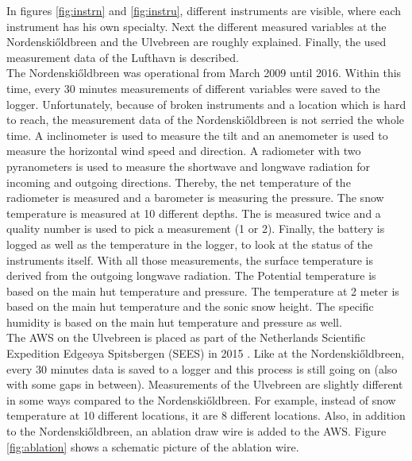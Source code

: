 \documentclass[11pt]{report}
\begin{document}
In figures \ref{fig:instrn} and \ref{fig:instru}, different instruments are visible, where each instrument has his own specialty. Next the different measured variables at the Nordenski\H{o}ldbreen and the Ulvebreen are roughly explained. Finally, the used measurement data of the Lufthavn is described.\\

The Nordenski\H{o}ldbreen was operational from March 2009 until 2016. Within this time, every 30 minutes measurements of different variables were saved to the logger. Unfortunately, because of broken instruments and a location which is hard to reach, the measurement data of the Nordenski\H{o}ldbreen is not serried the whole time. A inclinometer is used to measure the tilt and an anemometer is used to measure the horizontal wind speed and direction. A radiometer with two pyranometers is used to measure the shortwave and longwave radiation for incoming and outgoing directions. Thereby, the net temperature of the radiometer is measured and a barometer is measuring the pressure. The snow temperature is measured at 10 different depths. The  is measured twice and a quality number is used to pick a measurement (1 or 2). Finally, the battery is logged as well as the temperature in the logger, to look at the status of the instruments itself. With all those measurements, the surface temperature is derived from the outgoing longwave radiation. The Potential temperature is based on the main hut temperature and pressure. The temperature at 2 meter is based on the main hut temperature and the sonic snow height. The specific humidity is based on the main hut temperature and pressure as well. \\

The AWS on the Ulvebreen is placed as part of the Netherlands Scientific Expedition Edge$ø$ya Spitsbergen (SEES) in 2015 \cite{uuproj}. Like at the Nordenski\H{o}ldbreen, every 30 minutes data is saved to a logger and this process is still going on (also with some gaps in between). Measurements of the Ulvebreen are slightly different in some ways compared to the Nordenski\H{o}ldbreen. For example, instead of snow temperature at 10 different locations, it are 8 different locations. Also, in addition to the Nordenski\H{o}ldbreen, an ablation draw wire is added to the AWS. Figure \ref{fig:ablation} shows a schematic picture of the ablation wire. 
\end{document}
